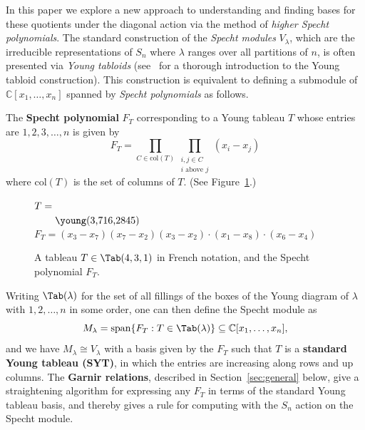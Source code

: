 In this paper we explore a new approach to understanding and finding bases for these quotients under the diagonal action via the method of \textit{higher Specht polynomials}.  The standard construction of the \textit{Specht modules} $V_\lambda$, which are the irreducible representations of $S_n$ where $\lambda$ ranges over all partitions of $n$, is often presented via \textit{Young tabloids} (see~\cite{Sagan} for a thorough introduction to the Young tabloid construction).  This construction is equivalent to defining a submodule of $\mathbb{C}[x_1,\ldots,x_n]$ spanned by \textit{Specht polynomials} as follows.

\begin{definition}
	The \textbf{Specht polynomial} $F_T$ corresponding to a Young tableau $T$ whose entries are $1,2,3,\ldots,n$ is given by $$F_T=\prod_{C\in\mathrm{col}(T)}\prod_{\substack{i,j\in C\\ i\text{ above }j}}(x_i-x_j)$$ where $\mathrm{col}(T)$ is the set of columns of $T$. (See Figure~\ref{fig:Specht}.)
\end{definition} 

\begin{figure}[ht]
	\centering
	$T=\raisebox{-0.5cm}{\young(3,716,2845)}$\hspace{2cm} $F_T=(x_3-x_7)(x_7-x_2)(x_3-x_2)\cdot (x_1-x_8)\cdot (x_6-x_4)$
	\caption{A tableau $T\in \Tab(4,3,1)$ in French notation, and the Specht polynomial $F_T$.}
	\label{fig:Specht}
\end{figure}

Writing $\Tab(\lambda)$ for the set of all fillings of the boxes of the Young diagram of $\lambda$ with $1,2,\ldots,n$ in some order, one can then define the Specht module 
as $$M_\lambda=\mathrm{span}\{F_T: T\in \Tab(\lambda)\}\subseteq \mathbb{C}[x_1,\ldots,x_n],$$ and we have $M_\lambda\cong V_\lambda$ with a basis given by the $F_T$ such that $T$ is a \textbf{standard Young tableau (SYT)}, in which the entries are increasing along rows and up columns.  The \textbf{Garnir relations}, described in Section~\ref{sec:general} below, give a straightening algorithm for expressing any $F_T$ in terms of the standard Young tableau basis, and thereby gives a rule for computing with the $S_n$ action on the Specht module.

